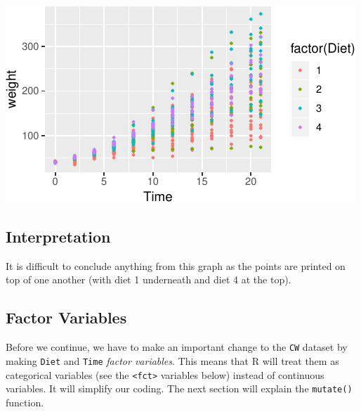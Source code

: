 \documentclass[a4paper,9pt,twocolumn,twoside,printwatermark=false]{pinp}
\begin{document}
\begin{center}\includegraphics{Getting-Started-in-R_files/figure-latex/addColourPlot-1} \end{center}

\subsection{Interpretation}\label{interpretation-1}

It is difficult to conclude anything from this graph as the points are
printed on top of one another (with diet 1 underneath and diet 4 at the
top).

\subsection{Factor Variables}\label{factor-variables}

Before we continue, we have to make an important change to the
\texttt{CW} dataset by making \texttt{Diet} and \texttt{Time}
\emph{factor variables}. This means that R will treat them as
categorical variables (see the \texttt{\textless{}fct\textgreater{}}
variables below) instead of continuous variables. It will simplify our
coding. The next section will explain the \texttt{mutate()} function.

\begin{Shaded}
\begin{Highlighting}[]
\StringTok{ } 
\StringTok{ } 
\end{Highlighting}
\end{Shaded}
\end{document}
